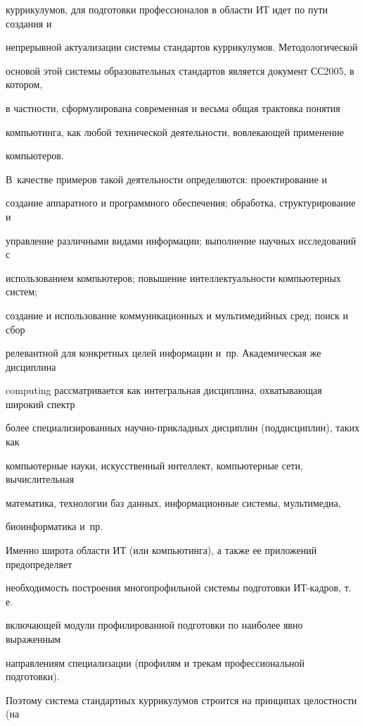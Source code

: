 куррикулумов, для подготовки профессионалов в области ИТ идет по пути создания и 

непрерывной актуализации системы стандартов куррикулумов. Методологической 

основой этой системы образовательных стандартов является документ СС2005, в котором, 

в частности, сформулирована современная и весьма общая трактовка понятия 

компьютинга, как любой технической деятельности, вовлекающей применение 

компьютеров. 



В~качестве примеров такой деятельности определяются: проектирование и 

создание аппаратного и программного обеспечения; обработка, структурирование и 

управление различными видами информации; выполнение научных исследований с 

использованием компьютеров; повышение интеллектуальности компьютерных систем; 

создание и использование коммуникационных и мультимедийных сред; поиск и сбор 

релевантной для конкретных целей информации и~пр. Академическая же дисциплина 

computing рассматривается как интегральная дисциплина, охватывающая широкий спектр 

более специализированных на\-уч\-но-при\-клад\-ных дисциплин (поддисциплин), таких как 

компьютерные науки, искусственный интеллект, компьютерные сети, вычислительная 

математика, технологии баз данных, информационные системы, мультимедиа, 

биоинформатика и~пр.



Именно широта области ИТ (или компьютинга), а также ее приложений пред\-опре\-де\-ля\-ет 

необходимость построения многопрофильной системы подготовки ИТ-кадров, т.\,е.\ 

включающей модули профилированной подготовки по наиболее явно выраженным 

направлениям специализации (профилям и трекам профессиональной подготовки). 

Поэтому система стандартных куррикулумов строится на принципах целостности (на 

